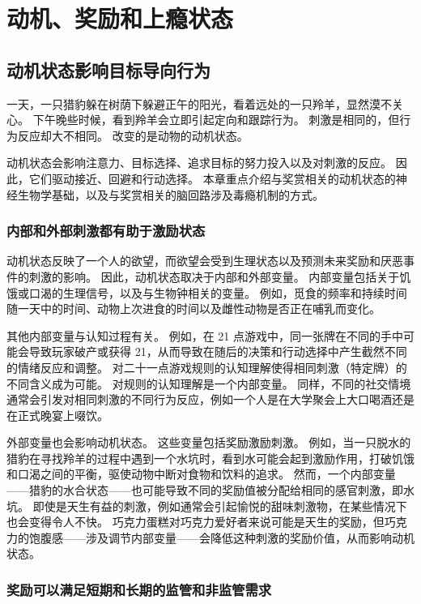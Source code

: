 \chapter{动机、奖励和上瘾状态} \label{chap:chap43}

\section{动机状态影响目标导向行为}

一天，一只猎豹躲在树荫下躲避正午的阳光，看着远处的一只羚羊，显然漠不关心。
下午晚些时候，看到羚羊会立即引起定向和跟踪行为。
刺激是相同的，但行为反应却大不相同。
改变的是动物的动机状态。


动机状态会影响注意力、目标选择、追求目标的努力投入以及对刺激的反应。
因此，它们驱动接近、回避和行动选择。
本章重点介绍与奖赏相关的动机状态的神经生物学基础，以及与奖赏相关的脑回路涉及毒瘾机制的方式。



\subsection{内部和外部刺激都有助于激励状态}

动机状态反映了一个人的欲望，而欲望会受到生理状态以及预测未来奖励和厌恶事件的刺激的影响。
因此，动机状态取决于内部和外部变量。
内部变量包括关于饥饿或口渴的生理信号，以及与生物钟相关的变量。
例如，觅食的频率和持续时间随一天中的时间、动物上次进食的时间以及雌性动物是否正在哺乳而变化。


其他内部变量与认知过程有关。
例如，在 21 点游戏中，同一张牌在不同的手中可能会导致玩家破产或获得 21，从而导致在随后的决策和行动选择中产生截然不同的情绪反应和调整。
对二十一点游戏规则的认知理解使得相同刺激（特定牌）的不同含义成为可能。
对规则的认知理解是一个内部变量。
同样，不同的社交情境通常会引发对相同刺激的不同行为反应，例如一个人是在大学聚会上大口喝酒还是在正式晚宴上啜饮。


外部变量也会影响动机状态。
这些变量包括奖励激励刺激。
例如，当一只脱水的猎豹在寻找羚羊的过程中遇到一个水坑时，看到水可能会起到激励作用，打破饥饿和口渴之间的平衡，驱使动物中断对食物和饮料的追求。
然而，一个内部变量——猎豹的水合状态——也可能导致不同的奖励值被分配给相同的感官刺激，即水坑。
即使是天生有益的刺激，例如通常会引起愉悦的甜味刺激物，在某些情况下也会变得令人不快。
巧克力蛋糕对巧克力爱好者来说可能是天生的奖励，但巧克力的饱腹感——涉及调节内部变量——会降低这种刺激的奖励价值，从而影响动机状态。



\subsection{奖励可以满足短期和长期的监管和非监管需求}

